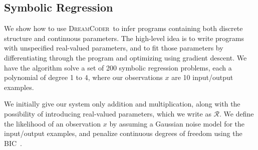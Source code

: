 \documentclass{article}
\newcommand{\system}{\textsc{DreamCoder}~}
\newcommand{\probability}{\mathds{P}} %
\begin{document}



\subsection{Symbolic Regression}\label{regressionSection}
We show how to use \system to infer programs containing both discrete
structure and continuous parameters. The high-level idea is to write programs with unspecified real-valued parameters, and to fit those parameters by differentiating through the program
and optimizing using gradient descent.
We have the algorithm 
solve a set of 200 symbolic regression problems, each a polynomial of
degree 1 to 4, where our observations $x$ are 10
input/output examples.%

We initially give our system only addition and multiplication,
along with the possibility of introducing real-valued parameters, which we write as $\mathcal{R}$.
We define the likelihood of an observation $x$ by assuming a Gaussian noise model for the input/output examples,
and penalize continuous degrees of freedom using the BIC~\cite{Bishop:2006:PRM:1162264}.

\end{document}
